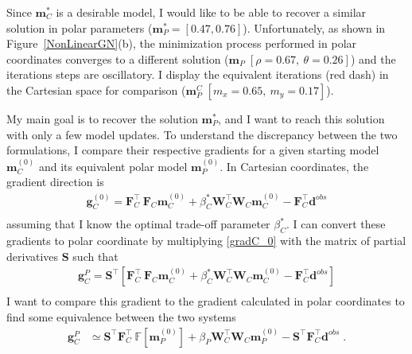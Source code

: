 Since $\mathbf{m}_C^*$ is a desirable model, I would like to be able to recover a similar solution in polar parameters ($\mathbf{m}_P^{*}=[0.47, 0.76]$). Unfortunately, as shown in Figure~\ref{NonLinearGN}(b), the minimization process performed in polar coordinates converges to a different solution ($\mathbf{m}_P\;[ \rho=0.67,\:\theta=0.26]$) and the iterations steps are oscillatory.
I display the equivalent iterations (red dash) in the Cartesian space for comparison ($\mathbf{m}_P^C\;[ m_x=0.65,\:m_y=0.17]$).

My main goal is to recover the solution $\mathbf{m}_P^{*}$, and I want to reach this solution with only a few model updates. 
To understand the discrepancy between the two formulations, I compare their respective gradients for a given starting model $\mathbf{m}_C^{(0)}$ and its equivalent polar model $\mathbf{m}_P^{(0)}$. In Cartesian coordinates, the gradient direction is
\begin{equation}\label{gradC_0}
\begin{split}
\mathbf{g}_C^{(0)} = \mathbf{F}_C^\top \:\mathbf{F}_C\mathbf{m}_C^{(0)} + \beta_C^* \mathbf{W}_C^\top\mathbf{W}_C \mathbf{m}_C^{(0)} - \mathbf{F}_C^\top \mathbf{d}^{obs} \\
\end{split}
\end{equation}
assuming that I know the optimal trade-off parameter $\beta_C^*$.
I can convert these gradients to polar coordinate by multiplying \eqref{gradC_0} with the matrix of partial derivatives $\mathbf{S}$ such that
\begin{equation}
\begin{split}
\mathbf{g}_C^P = \mathbf{S}^\top \left[ \mathbf{F}_C^\top \:\mathbf{F}_C\mathbf{m}_C^{(0)} + \beta_C^* \mathbf{W}_C^\top\mathbf{W}_C \mathbf{m}_C^{(0)} - \mathbf{F}_C^\top \mathbf{d}^{obs} \right] \\
\end{split}
\end{equation}
I want to compare this gradient to the gradient calculated in polar coordinates to find some equivalence between the two systems
\begin{equation}\label{gradientmCvsmP}
\begin{split}
\mathbf{g}_C^P &\simeq \mathbf{S}^\top \mathbf{F}_C^\top \:\mathbb{F}[\mathbf{m}_P^{(0)}] + \beta_P \mathbf{W}_C^\top\mathbf{W}_C \mathbf{m}_P^{(0)} - \mathbf{S}^\top \mathbf{F}_C^\top \mathbf{d}^{obs}\;.
\end{split}
\end{equation}
